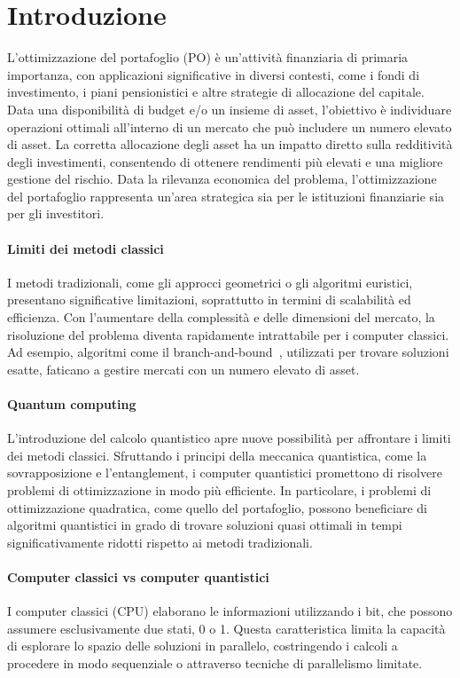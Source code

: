 \section{Introduzione}\label{sec:introduction}
L'ottimizzazione del portafoglio (PO) è un'attività finanziaria di primaria 
importanza, con applicazioni significative in diversi contesti, come 
i fondi di investimento, i piani pensionistici e altre strategie di 
allocazione del capitale. Data una disponibilità di budget e/o un 
insieme di asset, l'obiettivo è individuare operazioni ottimali 
all'interno di un mercato che può includere un numero elevato di asset.
La corretta allocazione degli asset ha un impatto diretto sulla 
redditività degli investimenti, consentendo di ottenere rendimenti più 
elevati e una migliore gestione del rischio. Data la rilevanza economica 
del problema, l'ottimizzazione del portafoglio rappresenta un'area 
strategica sia per le istituzioni finanziarie sia per gli investitori.

\paragraph{Limiti dei metodi classici}
I metodi tradizionali, come gli approcci geometrici o gli algoritmi 
euristici, presentano significative limitazioni, soprattutto in termini 
di scalabilità ed efficienza. Con l'aumentare della complessità e delle 
dimensioni del mercato, la risoluzione del problema diventa rapidamente 
intrattabile per i computer classici. Ad esempio, algoritmi come il 
branch-and-bound~\cite{land2010automatic}, utilizzati per trovare soluzioni 
esatte, faticano a gestire mercati con un numero elevato di asset. 

\paragraph{Quantum computing}
L'introduzione del calcolo quantistico apre nuove possibilità per 
affrontare i limiti dei metodi classici. Sfruttando i principi della 
meccanica quantistica, come la sovrapposizione e l'entanglement, i 
computer quantistici promettono di risolvere problemi di ottimizzazione 
in modo più efficiente. In particolare, i problemi di ottimizzazione 
quadratica, come quello del portafoglio, possono beneficiare di 
algoritmi quantistici in grado di trovare soluzioni quasi ottimali in 
tempi significativamente ridotti rispetto ai metodi tradizionali.

\paragraph{Computer classici vs computer quantistici}
I computer classici (CPU) elaborano le informazioni utilizzando i bit, che 
possono assumere esclusivamente due stati, 0 o 1. Questa caratteristica 
limita la capacità di esplorare lo spazio delle soluzioni in parallelo, 
costringendo i calcoli a procedere in modo sequenziale o attraverso 
tecniche di parallelismo limitate.

